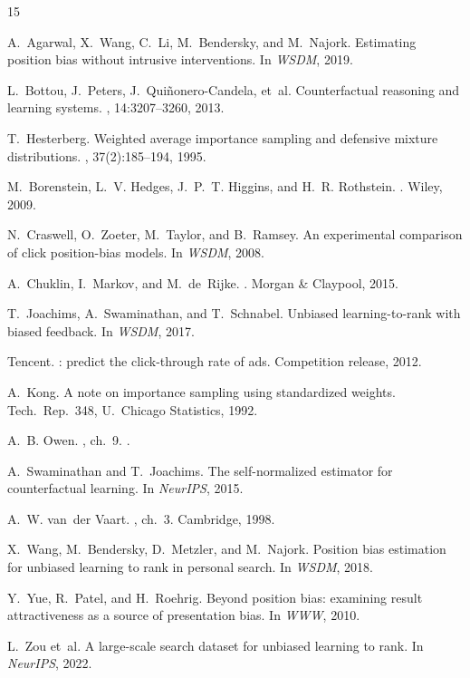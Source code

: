 \documentclass[sigconf]{acmart}
\begin{document}

\balance
\begin{thebibliography}{15}

A.~Agarwal, X.~Wang, C.~Li, M.~Bendersky, and M.~Najork.
\newblock Estimating position bias without intrusive interventions.
\newblock In {\em WSDM}, 2019.

L.~Bottou, J.~Peters, J.~Qui\~nonero-Candela, et~al.
\newblock Counterfactual reasoning and learning systems.
, 14:3207--3260, 2013.

T.~Hesterberg.
\newblock Weighted average importance sampling and defensive mixture distributions.
, 37(2):185--194, 1995.

M.~Borenstein, L.~V. Hedges, J.~P.~T. Higgins, and H.~R. Rothstein.
.
\newblock Wiley, 2009.

N.~Craswell, O.~Zoeter, M.~Taylor, and B.~Ramsey.
\newblock An experimental comparison of click position-bias models.
\newblock In {\em WSDM}, 2008.

A.~Chuklin, I.~Markov, and M.~de~Rijke.
.
\newblock Morgan \& Claypool, 2015.

T.~Joachims, A.~Swaminathan, and T.~Schnabel.
\newblock Unbiased learning-to-rank with biased feedback.
\newblock In {\em WSDM}, 2017.

Tencent.
: predict the click-through rate of ads.
\newblock Competition release, 2012.

A.~Kong.
\newblock A note on importance sampling using standardized weights.
\newblock Tech.\ Rep.\ 348, U.\ Chicago Statistics, 1992.

A.~B. Owen.
, ch.\ 9.
.

A.~Swaminathan and T.~Joachims.
\newblock The self-normalized estimator for counterfactual learning.
\newblock In {\em NeurIPS}, 2015.

A.~W. van~der Vaart.
, ch.\ 3.
\newblock Cambridge, 1998.

X.~Wang, M.~Bendersky, D.~Metzler, and M.~Najork.
\newblock Position bias estimation for unbiased learning to rank in personal search.
\newblock In {\em WSDM}, 2018.

Y.~Yue, R.~Patel, and H.~Roehrig.
\newblock Beyond position bias: examining result attractiveness as a source of presentation bias.
\newblock In {\em WWW}, 2010.

L.~Zou et~al.
\newblock A large-scale search dataset for unbiased learning to rank.
\newblock In {\em NeurIPS}, 2022.

\end{thebibliography}
\end{document}
